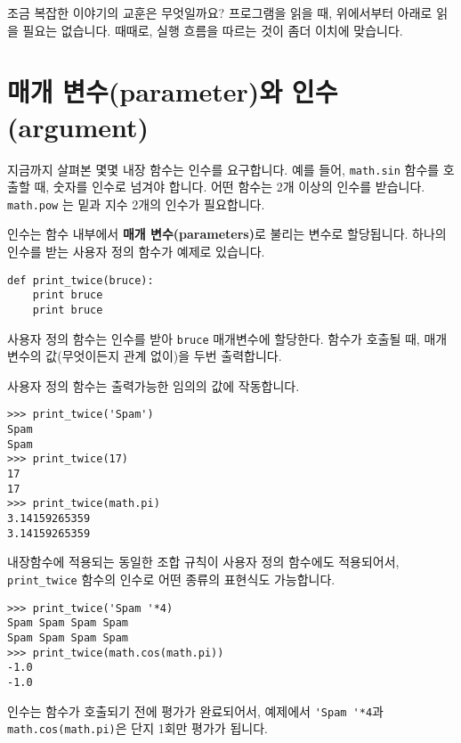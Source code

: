 조금 복잡한 이야기의 교훈은 무엇일까요? 프로그램을 읽을 때, 위에서부터 아래로 읽을 필요는 없습니다. 때때로, 실행 흐름을 따르는 것이 좀더 이치에 맞습니다.


\section{매개 변수(parameter)와 인수(argument)}
\label{parameters}

지금까지 살펴본 몇몇 내장 함수는 인수를 요구합니다. 예를 들어, {\tt math.sin} 함수를 호출할 때, 숫자를 인수로 넘겨야 합니다.
어떤 함수는 2개 이상의 인수를 받습니다. {\tt math.pow} 는 밑과 지수 2개의 인수가 필요합니다. 

인수는 함수 내부에서  {\bf 매개 변수(parameters)}로 불리는 변수로 할당됩니다.
하나의 인수를 받는 사용자 정의 함수가 예제로 있습니다.  


\beforeverb
\begin{verbatim}
def print_twice(bruce):
    print bruce
    print bruce
\end{verbatim}
\afterverb
%

사용자 정의 함수는 인수를 받아 {\tt bruce} 매개변수에 할당한다. 함수가 호출될 때, 매개변수의 값(무엇이든지 관계 없이)을 두번 출력합니다.

사용자 정의 함수는 출력가능한 임의의 값에 작동합니다.

\beforeverb
\begin{verbatim}
>>> print_twice('Spam')
Spam
Spam
>>> print_twice(17)
17
17
>>> print_twice(math.pi)
3.14159265359
3.14159265359
\end{verbatim}
\afterverb
%

내장함수에 적용되는 동일한 조합 규칙이 사용자 정의 함수에도 적용되어서, \verb"print_twice" 함수의 인수로 어떤 종류의 표현식도 가능합니다. 


\beforeverb
\begin{verbatim}
>>> print_twice('Spam '*4)
Spam Spam Spam Spam
Spam Spam Spam Spam
>>> print_twice(math.cos(math.pi))
-1.0
-1.0
\end{verbatim}
\afterverb
%

인수는 함수가 호출되기 전에 평가가 완료되어서, 예제에서 \verb"'Spam '*4"과 {\tt math.cos(math.pi)}은 단지 1회만 평가가 됩니다.



